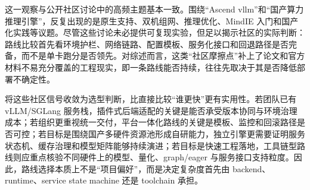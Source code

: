 这一观察与公开社区讨论中的高频主题基本一致。围绕“Ascend vllm”和“国产算力 推理引擎”，反复出现的是原生支持、双机组网、推理优化、MindIE 入门和国产化实践等议题。尽管这些讨论未必提供可复现实验，但足以揭示社区的实际判断：路线比较首先看环境护栏、网络链路、配置模板、服务化接口和回退路径是否完备，而不是单卡跑分是否领先。对综述而言，这类“社区摩擦点”补上了论文和官方材料不易充分覆盖的工程现实，即一条路线能否持续，往往先取决于其是否降低部署不确定性。

将这些社区信号收敛为选型判断，比直接比较“谁更快”更有实用性。若团队已有 vLLM/SGLang 服务栈，插件式后端适配的关键是能否承受版本协同与环境治理成本；若组织更重视统一交付，平台一体化路线的关键是模板、监控和回滚路径是否可控；若目标是围绕国产多硬件资源池形成自研能力，独立引擎更需要证明服务状态机、缓存治理和模型矩阵能够持续演进；若目标是快速工程落地，工具链型路线则应重点核验不同硬件上的模型、量化、graph/eager 与服务接口支持粒度\citep{vllmascend,sglang_ascend_npu,mindie,chitu_github,xllm_docs,fastdeploy_docs,lmdeploy_supported_models}。因此，路线选择本质上不是“项目偏好”，而是决定复杂度首先由 backend、runtime、service state machine 还是 toolchain 承担。

